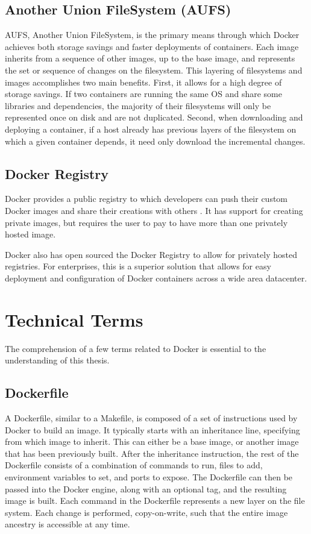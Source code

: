 \subsection{Another Union FileSystem (AUFS)}
AUFS, Another Union FileSystem, is the primary means through which Docker achieves both storage savings and faster deployments of containers. Each image inherits from a sequence of other images, up to the base image, and represents the set or sequence of changes on the filesystem. This layering of filesystems and images accomplishes two main benefits. First, it allows for a high degree of storage savings. If two containers are running the same OS and share some libraries and dependencies, the majority of their filesystems will only be represented once on disk and are not duplicated. Second, when downloading and deploying a container, if a host already has previous layers of the filesystem on which a given container depends, it need only download the incremental changes.

\subsection{Docker Registry}
Docker provides a public registry to which developers can push their custom Docker images and share their creations with others \cite{dockerregistry}. It has support for creating private images, but requires the user to pay to have more than one privately hosted image.

Docker also has open sourced the Docker Registry \cite{dockerregistry-github} to allow for privately hosted registries. For enterprises, this is a superior solution that allows for easy deployment and configuration of Docker containers across a wide area datacenter.

\section{Technical Terms}\label{ch2:lingo}
The comprehension of a few terms related to Docker is essential to the understanding of this thesis. 
\subsection{Dockerfile}
A Dockerfile, similar to a Makefile, is composed of a set of instructions used by Docker to build an image. It typically starts with an inheritance line, specifying from which image to inherit. This can either be a base image, or another image that has been previously built. After the inheritance instruction, the rest of the Dockerfile consists of a combination of commands to run, files to add, environment variables to set, and ports to expose. The Dockerfile can then be passed into the Docker engine, along with an optional tag, and the resulting image is built. Each command in the Dockerfile represents a new layer on the file system. Each change is performed, copy-on-write, such that the entire image ancestry is accessible at any time.

